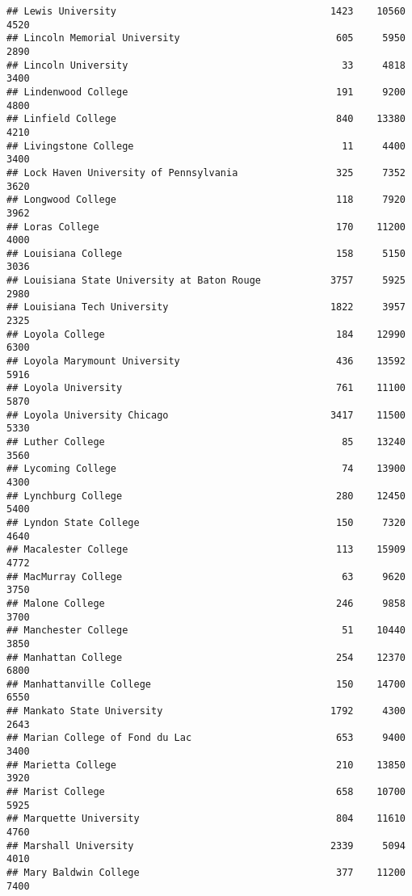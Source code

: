 \documentclass[
]{article}
\begin{document}
\begin{verbatim}
## Lewis University                                     1423    10560       4520
## Lincoln Memorial University                           605     5950       2890
## Lincoln University                                     33     4818       3400
## Lindenwood College                                    191     9200       4800
## Linfield College                                      840    13380       4210
## Livingstone College                                    11     4400       3400
## Lock Haven University of Pennsylvania                 325     7352       3620
## Longwood College                                      118     7920       3962
## Loras College                                         170    11200       4000
## Louisiana College                                     158     5150       3036
## Louisiana State University at Baton Rouge            3757     5925       2980
## Louisiana Tech University                            1822     3957       2325
## Loyola College                                        184    12990       6300
## Loyola Marymount University                           436    13592       5916
## Loyola University                                     761    11100       5870
## Loyola University Chicago                            3417    11500       5330
## Luther College                                         85    13240       3560
## Lycoming College                                       74    13900       4300
## Lynchburg College                                     280    12450       5400
## Lyndon State College                                  150     7320       4640
## Macalester College                                    113    15909       4772
## MacMurray College                                      63     9620       3750
## Malone College                                        246     9858       3700
## Manchester College                                     51    10440       3850
## Manhattan College                                     254    12370       6800
## Manhattanville College                                150    14700       6550
## Mankato State University                             1792     4300       2643
## Marian College of Fond du Lac                         653     9400       3400
## Marietta College                                      210    13850       3920
## Marist College                                        658    10700       5925
## Marquette University                                  804    11610       4760
## Marshall University                                  2339     5094       4010
## Mary Baldwin College                                  377    11200       7400

\end{verbatim}
\end{document}
